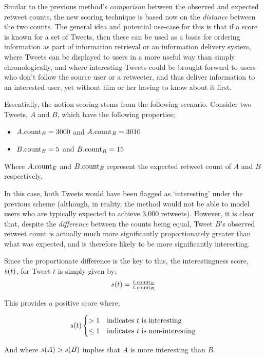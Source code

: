 Similar to the previous method's \textit{comparison} between the observed and expected retweet counts, the new scoring technique is based now on the \textit{distance} between the two counts. The general idea and potential use-case for this is that if a score is known for a set of Tweets, then these can be used as a basis for ordering information as part of information retrieval or an information delivery system, where Tweets can be displayed to users in a more useful way than simply chronologically, and where interesting Tweets could be brought forward to users who don't follow the source user or a retweeter, and thus deliver information to an interested user, yet without him or her having to know about it first.

Essentially, the notion scoring stems from the following scenario. Consider two Tweets, $A$ and $B$, which have the following properties;
\begin{itemize}
    \item $A.\textrm{count}_E = 3000$ and $A.\textrm{count}_R = 3010$
    \item $B.\textrm{count}_E = 5$ and $B.\textrm{count}_R = 15$
\end{itemize}
Where $A.\textrm{count}_E$ and $B.\textrm{count}_E$ represent the expected retweet count of $A$ and $B$ respectively.

In this case, both Tweets would have been flagged as `interesting' under the previous scheme (although, in reality, the method would not be able to model users who are typically expected to achieve 3,000 retweets). However, it is clear that, despite the \textit{difference} between the counts being equal, Tweet $B$'s observed retweet count is actually much more significantly proportionately greater than what was expected, and is therefore likely to be more significantly interesting.

Since the proportionate difference is the key to this, the interestingness score, $s(t)$, for Tweet $t$ is simply given by;
\[
\begin{array}{cc}
 s(t) = \frac{t.\textrm{count}_E}{t.\textrm{count}_R}
\end{array}
\]

This provides a positive score where;

\[
s(t)
	\begin{cases}
		> 1		&	\text{indicates } t	\text{ is interesting} \\
		\leq 1	&	\text{indicates } t	\text{ is non-interesting}
  \end{cases}
\]

And where $s(A) > s(B)$ implies that $A$ is more interesting than $B$.

